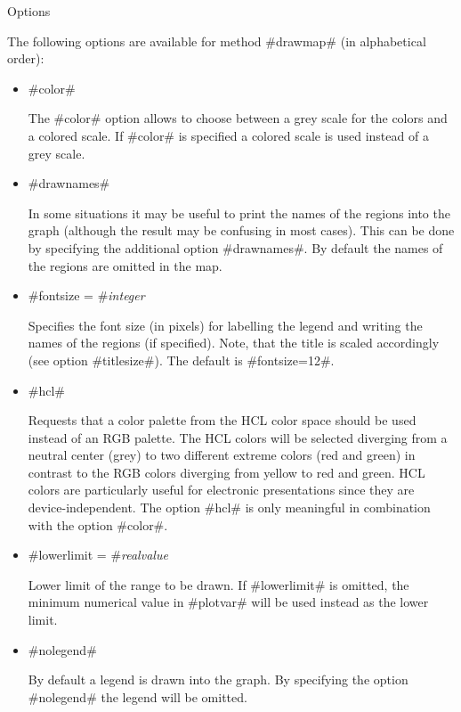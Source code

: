 \begin{stanza}{Options}

The following options are available for method #drawmap# (in
alphabetical order):

\end{stanza}

\begin{itemize}
\item #color#

The #color# option allows to choose between a grey scale for the
colors and a colored scale. If #color# is specified a colored
scale is used instead of a grey scale.

\item #drawnames#

In some situations it may be useful to print the names of the
regions into the graph (although the result may be confusing in
most cases). This can be done by specifying the additional option
#drawnames#. By default the names of the regions are omitted in
the map.

\item #fontsize = #{\em integer}

Specifies the font size (in pixels) for labelling the legend and
writing the names of the regions (if specified). Note, that the
title is scaled accordingly (see option #titlesize#). The default is
#fontsize=12#.

\item #hcl#

Requests that a color palette from the HCL color space should be
used instead of an RGB palette. The HCL colors will be selected
diverging from a neutral center (grey) to two different extreme
colors (red and green) in contrast to the RGB colors diverging from
yellow to red and green. HCL colors are particularly useful for
electronic presentations since they are device-independent. The
option #hcl# is only meaningful in combination with the option
#color#.

\item #lowerlimit = #{\em realvalue}

Lower limit of the range to be drawn. If #lowerlimit# is omitted,
the minimum numerical value in #plotvar# will be used instead as
the lower limit.

\item #nolegend#

By default a legend is drawn into the graph. By specifying the
option #nolegend# the legend will be omitted.


\end{itemize}
